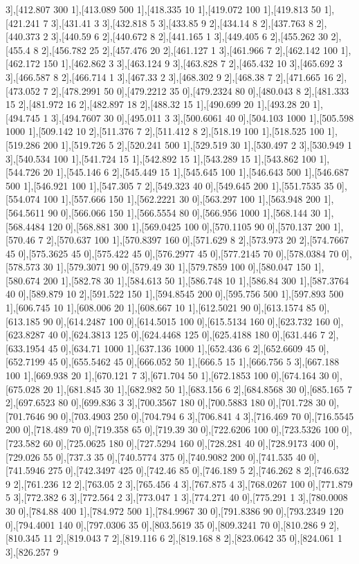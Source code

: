 {3],[412.807 300 1],[413.089 500 1],[418.335 10 1],[419.072 100 1],[419.813 50 1],[421.241 7 3],[431.41 3 3],[432.818 5 3],[433.85 9 2],[434.14 8 2],[437.763 8 2],[440.373 2 3],[440.59 6 2],[440.672 8 2],[441.165 1 3],[449.405 6 2],[455.262 30 2],[455.4 8 2],[456.782 25 2],[457.476 20 2],[461.127 1 3],[461.966 7 2],[462.142 100 1],[462.172 150 1],[462.862 3 3],[463.124 9 3],[463.828 7 2],[465.432 10 3],[465.692 3 3],[466.587 8 2],[466.714 1 3],[467.33 2 3],[468.302 9 2],[468.38 7 2],[471.665 16 2],[473.052 7 2],[478.2991 50 0],[479.2212 35 0],[479.2324 80 0],[480.043 8 2],[481.333 15 2],[481.972 16 2],[482.897 18 2],[488.32 15 1],[490.699 20 1],[493.28 20 1],[494.745 1 3],[494.7607 30 0],[495.011 3 3],[500.6061 40 0],[504.103 1000 1],[505.598 1000 1],[509.142 10 2],[511.376 7 2],[511.412 8 2],[518.19 100 1],[518.525 100 1],[519.286 200 1],[519.726 5 2],[520.241 500 1],[529.519 30 1],[530.497 2 3],[530.949 1 3],[540.534 100 1],[541.724 15 1],[542.892 15 1],[543.289 15 1],[543.862 100 1],[544.726 20 1],[545.146 6 2],[545.449 15 1],[545.645 100 1],[546.643 500 1],[546.687 500 1],[546.921 100 1],[547.305 7 2],[549.323 40 0],[549.645 200 1],[551.7535 35 0],[554.074 100 1],[557.666 150 1],[562.2221 30 0],[563.297 100 1],[563.948 200 1],[564.5611 90 0],[566.066 150 1],[566.5554 80 0],[566.956 1000 1],[568.144 30 1],[568.4484 120 0],[568.881 300 1],[569.0425 100 0],[570.1105 90 0],[570.137 200 1],[570.46 7 2],[570.637 100 1],[570.8397 160 0],[571.629 8 2],[573.973 20 2],[574.7667 45 0],[575.3625 45 0],[575.422 45 0],[576.2977 45 0],[577.2145 70 0],[578.0384 70 0],[578.573 30 1],[579.3071 90 0],[579.49 30 1],[579.7859 100 0],[580.047 150 1],[580.674 200 1],[582.78 30 1],[584.613 50 1],[586.748 10 1],[586.84 300 1],[587.3764 40 0],[589.879 10 2],[591.522 150 1],[594.8545 200 0],[595.756 500 1],[597.893 500 1],[606.745 10 1],[608.006 20 1],[608.667 10 1],[612.5021 90 0],[613.1574 85 0],[613.185 90 0],[614.2487 100 0],[614.5015 100 0],[615.5134 160 0],[623.732 160 0],[623.8287 40 0],[624.3813 125 0],[624.4468 125 0],[625.4188 180 0],[631.446 7 2],[633.1954 45 0],[634.71 1000 1],[637.136 1000 1],[652.436 6 2],[652.6609 45 0],[652.7199 45 0],[655.5462 45 0],[666.052 50 1],[666.5 15 1],[666.756 5 3],[667.188 100 1],[669.938 20 1],[670.121 7 3],[671.704 50 1],[672.1853 100 0],[674.164 30 0],[675.028 20 1],[681.845 30 1],[682.982 50 1],[683.156 6 2],[684.8568 30 0],[685.165 7 2],[697.6523 80 0],[699.836 3 3],[700.3567 180 0],[700.5883 180 0],[701.728 30 0],[701.7646 90 0],[703.4903 250 0],[704.794 6 3],[706.841 4 3],[716.469 70 0],[716.5545 200 0],[718.489 70 0],[719.358 65 0],[719.39 30 0],[722.6206 100 0],[723.5326 100 0],[723.582 60 0],[725.0625 180 0],[727.5294 160 0],[728.281 40 0],[728.9173 400 0],[729.026 55 0],[737.3 35 0],[740.5774 375 0],[740.9082 200 0],[741.535 40 0],[741.5946 275 0],[742.3497 425 0],[742.46 85 0],[746.189 5 2],[746.262 8 2],[746.632 9 2],[761.236 12 2],[763.05 2 3],[765.456 4 3],[767.875 4 3],[768.0267 100 0],[771.879 5 3],[772.382 6 3],[772.564 2 3],[773.047 1 3],[774.271 40 0],[775.291 1 3],[780.0008 30 0],[784.88 400 1],[784.972 500 1],[784.9967 30 0],[791.8386 90 0],[793.2349 120 0],[794.4001 140 0],[797.0306 35 0],[803.5619 35 0],[809.3241 70 0],[810.286 9 2],[810.345 11 2],[819.043 7 2],[819.116 6 2],[819.168 8 2],[823.0642 35 0],[824.061 1 3],[826.257 9 }
